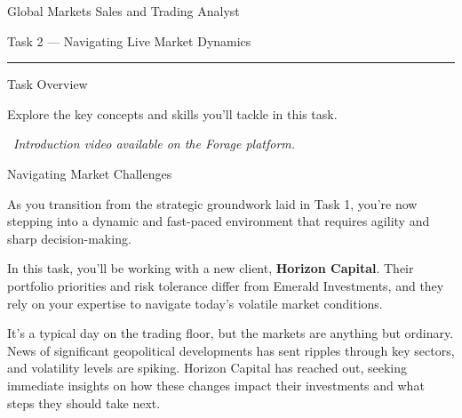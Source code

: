 \documentclass[11pt]{article}
\begin{document}
{\LARGE Global Markets Sales and Trading Analyst}\par\medskip
{\large Task 2 --- Navigating Live Market Dynamics}\par
{\color{rulegray}\rule{\linewidth}{0.6pt}}\par\bigskip

{\fontsize{26}{30}\selectfont Task Overview}\par\bigskip



Explore the key concepts and skills you'll tackle in this task.\par\medskip
{\color{gray}\faPlayCircle\ \textit{Introduction video available on the Forage
platform.}}

\newpage
{\fontsize{26}{30}\selectfont Navigating Market Challenges}\par\bigskip

As you transition from the strategic groundwork laid in Task 1, you're now
stepping into a dynamic and fast-paced environment that requires agility and
sharp decision-making.

In this task, you'll be working with a new client, \textbf{Horizon Capital}.
Their portfolio priorities and risk tolerance differ from Emerald Investments,
and they rely on your expertise to navigate today's volatile market
conditions.

It's a typical day on the trading floor, but the markets are anything but
ordinary. News of significant geopolitical developments has sent ripples
through key sectors, and volatility levels are spiking. Horizon Capital has
reached out, seeking immediate insights on how these changes impact their
investments and what steps they should take next.
\end{document}
